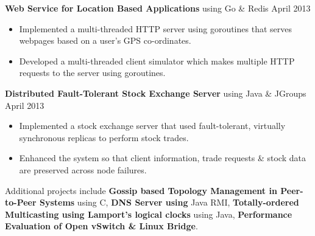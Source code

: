 \documentclass[10pt, letterpaper]{article}
\begin{document}

\textbf{Web Service for Location Based Applications} using Go \& Redis \hfill April 2013
\begin{itemize}
    \item Implemented a multi-threaded HTTP server using goroutines that serves webpages
based on a user's GPS co-ordinates.
    \item Developed a multi-threaded client simulator which makes multiple HTTP requests
to the server using goroutines.
\end{itemize}

\textbf{Distributed Fault-Tolerant Stock Exchange Server} using Java \& JGroups \hfill April 2013
\begin{itemize}
    \item Implemented a stock exchange server that used fault-tolerant, virtually synchronous replicas to perform stock trades.
    \item Enhanced the system so that client information, trade requests \& stock data are preserved across node failures. %
\end{itemize}

Additional projects include 
\textbf{Gossip based Topology Management in Peer-to-Peer Systems} using C,  
\textbf{DNS Server using} Java RMI, 
\textbf{Totally-ordered Multicasting using Lamport's logical clocks} using Java, 
\textbf{Performance Evaluation of Open vSwitch \& Linux Bridge}.
\end{document}

